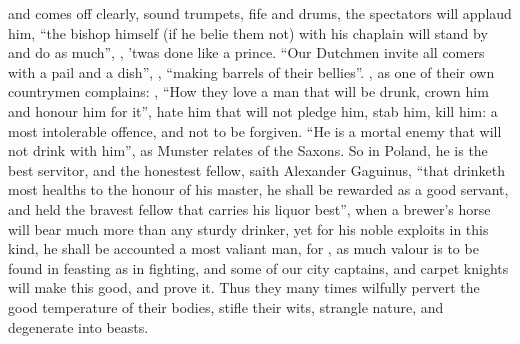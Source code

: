 
and comes off clearly, sound trumpets, fife and drums, the spectators will
applaud him, \enquote{the bishop himself (if he belie them not)
with his chaplain will stand by and do as much}, , 'twas done like a prince. \enquote{Our Dutchmen invite all comers with a pail
and a dish}, , \enquote{making barrels of their
bellies}. , as one of their own
countrymen complains: , \etc{} \enquote{How they love a man that will be drunk, crown him and
honour him for it}, hate him that will not pledge him, stab him, kill him: a
most intolerable offence, and not to be forgiven. \enquote{He is a
mortal enemy that will not drink with him}, as Munster relates of the Saxons.
So in Poland, he is the best servitor, and the honestest fellow, saith
Alexander Gaguinus, \enquote{that drinketh most healths to the
honour of his master, he shall be rewarded as a good servant, and held the
bravest fellow that carries his liquor best}, when a brewer's horse will bear
much more than any sturdy drinker, yet for his noble exploits in this kind, he
shall be accounted a most valiant man, for , as much valour is to be found in
feasting as in fighting, and some of our city captains, and carpet knights will
make this good, and prove it. Thus they many times wilfully pervert the good
temperature of their bodies, stifle their wits, strangle nature, and degenerate
into beasts.

